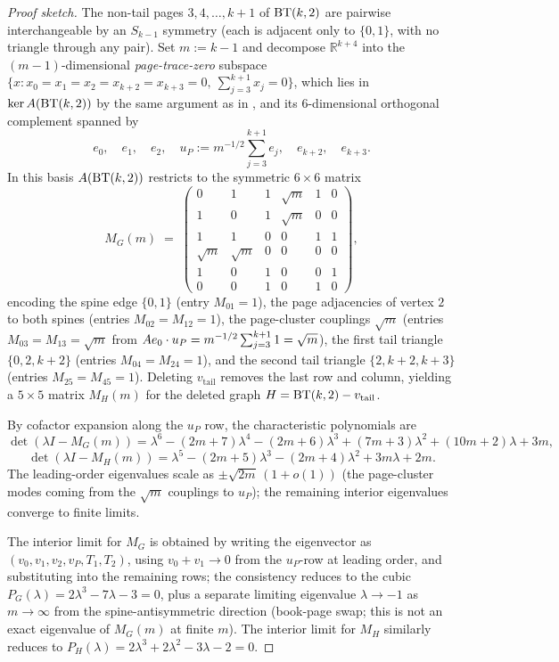 \begin{proof}[Proof sketch]
The non-tail pages $3, 4, \ldots, k+1$ of $\mathrm{BT}(k,2)$ are pairwise
interchangeable by an $S_{k-1}$ symmetry (each is adjacent only to
$\{0, 1\}$, with no triangle through any pair). Set $m := k - 1$ and
decompose $\mathbb{R}^{k+4}$ into the $(m - 1)$-dimensional
\emph{page-trace-zero} subspace
$\{x : x_{0} = x_{1} = x_{2} = x_{k+2} = x_{k+3} = 0,\ \sum_{j=3}^{k+1} x_{j} = 0\}$,
which lies in $\ker A(\mathrm{BT}(k,2))$ by the same argument as in
, and its $6$-dimensional orthogonal complement
spanned by
\[
e_{0},\quad e_{1},\quad e_{2},\quad
u_{P} := m^{-1/2} \sum_{j=3}^{k+1} e_{j},\quad
e_{k+2},\quad e_{k+3}.
\]
In this basis $A(\mathrm{BT}(k,2))$ restricts to the symmetric
$6 \times 6$ matrix
\[
M_{G}(m)
\;=\;
\begin{pmatrix}
0 & 1 & 1 & \sqrt{m} & 1 & 0 \\
1 & 0 & 1 & \sqrt{m} & 0 & 0 \\
1 & 1 & 0 & 0 & 1 & 1 \\
\sqrt{m} & \sqrt{m} & 0 & 0 & 0 & 0 \\
1 & 0 & 1 & 0 & 0 & 1 \\
0 & 0 & 1 & 0 & 1 & 0
\end{pmatrix},
\]
encoding the spine edge $\{0, 1\}$ (entry $M_{01} = 1$), the page
adjacencies of vertex $2$ to both spines (entries $M_{02} = M_{12} = 1$),
the page-cluster couplings $\sqrt{m}$ (entries $M_{03} = M_{13} = \sqrt{m}$
from $A e_{0} \cdot u_{P} = m^{-1/2} \sum_{j=3}^{k+1} 1 = \sqrt{m}$),
the first tail triangle $\{0, 2, k+2\}$ (entries $M_{04} = M_{24} = 1$),
and the second tail triangle $\{2, k+2, k+3\}$
(entries $M_{25} = M_{45} = 1$). Deleting $v_{\mathrm{tail}}$ removes
the last row and column, yielding a $5 \times 5$ matrix $M_{H}(m)$
for the deleted graph $H = \mathrm{BT}(k,2) - v_{\mathrm{tail}}$.

By cofactor expansion along the $u_{P}$ row, the characteristic
polynomials are
\[
\det(\lambda I - M_{G}(m))
= \lambda^{6} - (2m + 7)\lambda^{4} - (2m + 6)\lambda^{3}
+ (7m + 3)\lambda^{2} + (10m + 2)\lambda + 3m,
\]
\[
\det(\lambda I - M_{H}(m))
= \lambda^{5} - (2m + 5)\lambda^{3} - (2m + 4)\lambda^{2}
+ 3m\lambda + 2m.
\]
The leading-order eigenvalues scale as $\pm\sqrt{2m}\,(1 + o(1))$
(the page-cluster modes coming from the $\sqrt{m}$ couplings to
$u_{P}$); the remaining interior eigenvalues converge to finite
limits.

The interior limit for $M_{G}$ is obtained by writing the eigenvector
as $(v_{0}, v_{1}, v_{2}, v_{P}, T_{1}, T_{2})$, using $v_{0} + v_{1} \to 0$
from the $u_{P}$-row at leading order, and substituting into the
remaining rows; the consistency reduces to the cubic
$P_{G}(\lambda) = 2\lambda^{3} - 7\lambda - 3 = 0$, plus a separate
limiting eigenvalue $\lambda \to -1$ as $m \to \infty$ from the
spine-antisymmetric direction (book-page swap; this is not an exact
eigenvalue of $M_{G}(m)$ at finite $m$). The interior limit for $M_{H}$ similarly reduces to
$P_{H}(\lambda) = 2\lambda^{3} + 2\lambda^{2} - 3\lambda - 2 = 0$.


\end{proof}
